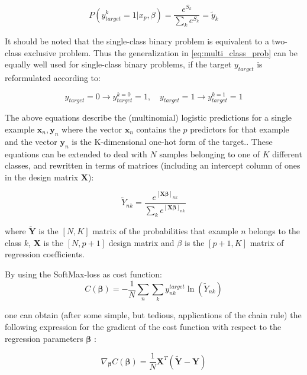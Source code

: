 \documentclass[reprint, english, nofootinbib]{revtex4-2}
\begin{document}
\begin{equation}
\label{eq:multi_class_prob}
P(y^k_{target} = 1 | x_p, \beta) = \frac{e^{S_k}}{\sum_k e^{S_k}} = \tilde{y}_k
\end{equation}

It should be noted that the single-class binary problem is equivalent to a two-class exclusive problem. Thus the generalization in \ref{eq:multi_class_prob} can be equally well used for single-class binary problems, if the target $y_{target}$ is reformulated according to:

\begin{equation}
\label{eq:single_to_mult_target}
y_{target} = 0 \rightarrow y_{target}^{k=0} = 1, \quad
y_{target} = 1 \rightarrow y_{target}^{k=1} = 1
\end{equation}

The above equations describe the (multinomial) logistic predictions for a single example $\mathbf{x}_n, \mathbf{y}_n$ where the vector $\mathbf{x}_n$ contains the $p$ predictors for that example and the vector $\mathbf{y}_n$ is the K-dimensional one-hot form of the target.. These equations can be extended to deal with $N$ samples belonging to one of $K$ different classes, and rewritten in terms of matrices (including an intercept column of ones in the design matrix $\mathbf{X}$):

\begin{equation}
\label{eq:logreg_pred_matrix}
\tilde{Y}_{nk} = \frac{ e^{[\mathbf{X} \mathbf{\beta}]_{nk}}} { \sum_k e^{[\mathbf{X} \mathbf{\beta}]_{nk}} }
\end{equation}

where $\mathbf{\tilde{Y}}$ is the $[N,K]$ matrix of the probabilities that example $n$ belongs to the class $k$, $\mathbf{X}$ is the $[N,p+1]$ design matrix and $\mathbb{\beta}$ is the $[p+1,K]$ matrix of regression coefficients.

By using the SoftMax-loss as cost function:
\begin{equation}
\label{eq:logreg_cost}
C(\mathbf{\beta}) = - \frac{1}{N} \sum_n \sum_k y^{target}_{nk}  \ln (\tilde{Y}_{nk})
\end{equation}

one can obtain (after some simple, but tedious, applications of the chain rule) the following expression for the gradient of the cost function with respect to the regression parameters $\mathbf{\beta}$ :

 \begin{equation}
\label{eq:logreg_grad}
\nabla_{\mathbf{\beta}} C(\mathbf{\beta}) = \frac{1}{N} \mathbf{X}^T (\mathbf{\tilde{Y}} - \mathbf{Y} )
\end{equation}
\end{document}
